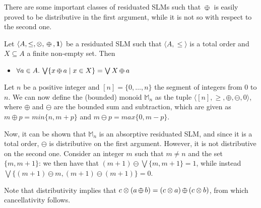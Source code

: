 \documentclass{llncs}
\def\monid{{\mathbf 0}}
\def\monop{\otimes}
\def\odiv{\, {\ominus\hspace{-7.7pt} \div} \,}
\def\monid{\mathbf{1}}
\begin{document}
There are some important classes of residuated SLMs  such that $\odiv$ is easily proved to be distributive in the first argument,
while it is not so with respect to the second one.

\begin{lemma}
	\label{distodiv2}
	Let $\langle A, \leq, \monop, \odiv, \monid \rangle$ be a residuated SLM such that $\langle A, \leq \rangle$ is a total order and $X \subseteq A$ a finite non-empty set. Then 
	\begin{itemize}
		\item $\forall a \in A.\, \bigvee \{ x \odiv a \mid x \in X \} = \bigvee X \odiv a$
	\end{itemize}	
\end{lemma}


\begin{example}
\label{nodist2}
%
Let $n$ be a positive integer and $[n] = \{0, \ldots, n\}$ the segment of integers from $0$ to $n$. We can now define the (bounded) monoid $\mathbb{M}_n$ 
as the tuple $\langle [n], \geq, \oplus, \ominus, 0 \rangle$, where $\oplus$ and $\ominus$ are the bounded sum and subtraction, 
which are given as $m\oplus p = min\{n, m+p\}$ and $m\ominus p = max\{0,m-p\}$.

Now, it can be shown that $\mathbb{M}_n$ is an absorptive residuated SLM, and since it is a total order,
$\ominus$ is  distributive on the first argument.
%
However, it is not distributive on the second one. Consider an integer $m$ such that 
$m \neq n$ and the set $\{m, m+1\}$:
we then have that $(m+1) \ominus \bigvee\{m, m+1\} = 1$,
while instead $\bigvee\{(m+1) \ominus m, (m+1) \ominus (m+1)\} = 0$.
\end{example}

\begin{remark}
Note that distributivity implies that $c \otimes (a \odiv b) = (c \otimes a) \odiv (c \otimes b)$,
from which cancellativity follows.
\end{remark}
\end{document}
